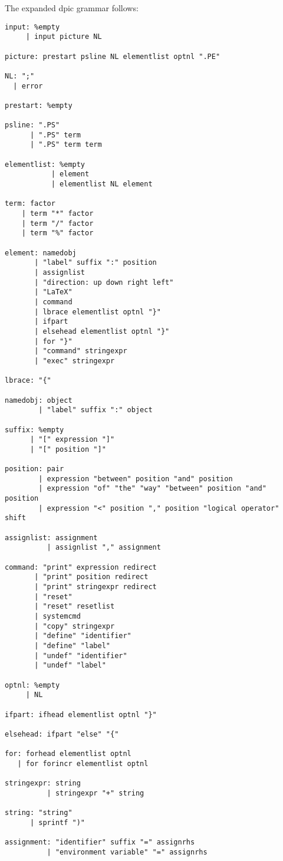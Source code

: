 \documentclass[11pt]{article}
\begin{document}
The expanded dpic grammar follows:
\begin{verbatim}
input: %empty
     | input picture NL

picture: prestart psline NL elementlist optnl ".PE"

NL: ";"
  | error

prestart: %empty

psline: ".PS"
      | ".PS" term
      | ".PS" term term

elementlist: %empty
           | element
           | elementlist NL element

term: factor
    | term "*" factor
    | term "/" factor
    | term "%" factor

element: namedobj
       | "label" suffix ":" position
       | assignlist
       | "direction: up down right left"
       | "LaTeX"
       | command
       | lbrace elementlist optnl "}"
       | ifpart
       | elsehead elementlist optnl "}"
       | for "}"
       | "command" stringexpr
       | "exec" stringexpr

lbrace: "{"

namedobj: object
        | "label" suffix ":" object

suffix: %empty
      | "[" expression "]"
      | "[" position "]"

position: pair
        | expression "between" position "and" position
        | expression "of" "the" "way" "between" position "and" position
        | expression "<" position "," position "logical operator" shift

assignlist: assignment
          | assignlist "," assignment

command: "print" expression redirect
       | "print" position redirect
       | "print" stringexpr redirect
       | "reset"
       | "reset" resetlist
       | systemcmd
       | "copy" stringexpr
       | "define" "identifier"
       | "define" "label"
       | "undef" "identifier"
       | "undef" "label"

optnl: %empty
     | NL

ifpart: ifhead elementlist optnl "}"

elsehead: ifpart "else" "{"

for: forhead elementlist optnl
   | for forincr elementlist optnl

stringexpr: string
          | stringexpr "+" string

string: "string"
      | sprintf ")"

assignment: "identifier" suffix "=" assignrhs
          | "environment variable" "=" assignrhs


\end{verbatim}
\end{document}
